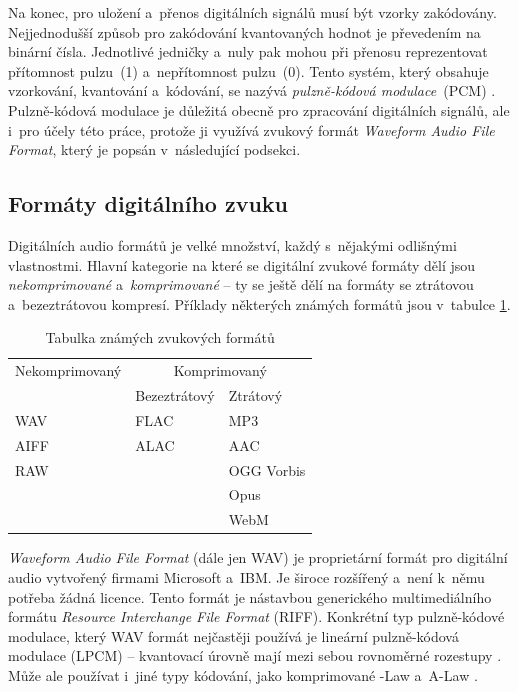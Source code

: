 Na konec, pro uložení a~přenos digitálních signálů musí být vzorky zakódovány.
Nejjednodušší způsob pro zakódování kvantovaných hodnot je převedením na
binární čísla. Jednotlivé jedničky a~nuly pak mohou při přenosu reprezentovat
přítomnost pulzu~(1) a~nepřítomnost pulzu~(0). Tento systém, který obsahuje
vzorkování, kvantování a~kódování, se nazývá \textit{pulzně-kódová
modulace}~(PCM) \cite{Oliver1948}. Pulzně-kódová modulace je důležitá obecně
pro zpracování digitálních signálů, ale i~pro účely této práce, protože ji
využívá zvukový formát \textit{Waveform Audio File Format}, který je popsán
v~následující podsekci.

\subsection*{Formáty digitálního zvuku}
\label{sub:digital-audio-formats}

Digitálních audio formátů je velké množství, každý s~nějakými odlišnými
vlastnostmi. Hlavní kategorie na které se digitální zvukové formáty dělí jsou
\textit{nekomprimované} a~\textit{komprimované} -- ty se ještě dělí na formáty
se ztrátovou a~bezeztrátovou kompresí. Příklady některých známých formátů jsou
v~tabulce \ref{tab:audio-formats}.

\begin{table}[H]
    \vskip6pt
    \caption{Tabulka známých zvukových formátů}
    \vskip6pt
    \centering
    \begin{tabular}{lll}
        \toprule
        Nekomprimovaný & \multicolumn{2}{c}{Komprimovaný} \\
        \cmidrule(r){2-3}
                       & Bezeztrátový & Ztrátový \\
        \midrule
        WAV  & FLAC & MP3 \\
        AIFF & ALAC & AAC \\
        RAW  &      & OGG Vorbis \\
             &      & Opus \\
             &      & WebM \\
        \bottomrule
    \end{tabular}
    \label{tab:audio-formats}
\end{table}

\textit{Waveform Audio File Format} (dále jen WAV) je proprietární formát pro
digitální audio vytvořený firmami Microsoft a~IBM. Je široce rozšířený a~není
k~němu potřeba žádná licence. Tento formát je nástavbou generického
multimediálního formátu \textit{Resource Interchange File Format} (RIFF).
Konkrétní typ pulzně-kódové modulace, který WAV formát nejčastěji používá je
lineární pulzně-kódová modulace (LPCM) \cite{WAVE} -- kvantovací úrovně mají
mezi sebou rovnoměrné rozestupy \cite{LPCM}. Může ale používat i~jiné typy
kódování, jako komprimované \textmu-Law a~A-Law \cite{WAVE}.

